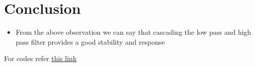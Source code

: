 \documentclass{article}
\begin{document}
\section{Conclusion}
\begin{itemize}
    \item From the above observation we can say that cascading the low pass and high pass filter provides a good stability and response
\end{itemize}
For codes refer \href{https://github.com/ArnavYadnopavit/ElectricalLabEE1200/tree/main/Labreport6/codes}{this link}
\end{document}
